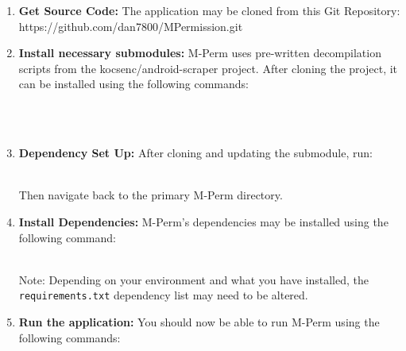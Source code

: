 \documentclass{sig-alternate-05-2015}
\begin{document}
\begin{enumerate}
	\item \textbf{Get Source Code:} The application may be cloned from this Git Repository: https://github.com/dan7800/MPermission.git
	
	
	\item \textbf{Install necessary submodules:} M-Perm uses pre-written decompilation scripts from the kocsenc/android-scraper project. After cloning the project, it can be installed using the following commands:
	
	\noindent
	 \\
	 \noindent
	 \\
	
	
	\item \textbf{Dependency Set Up:} After cloning and updating the submodule, run:
	
	\noindent
	 \\
	
	Then navigate back to the primary M-Perm directory.\\
	
	\item \textbf{Install Dependencies:} M-Perm's dependencies may be installed using the following command:
	
	\noindent
	 \\
	
	Note: Depending on your environment and what you have installed, the \texttt{requirements.txt} dependency list may need to be altered.\\
	
	\item \textbf{Run the application:} You should now be able to run M-Perm using the following commands:
		
	\noindent
	 \\
	
	\noindent
	 \\



\end{enumerate}
\end{document}
